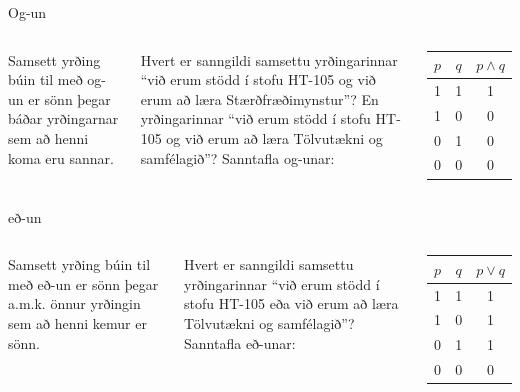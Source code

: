 \documentclass[handout]{beamer}
\begin{document}
\begin{frame}{Og-un}
\begin{columns}
Samsett yrðing búin til með og-un er sönn þegar báðar yrðingarnar sem að henni koma eru sannar.

\vspace*{0.5cm}
Hvert er sanngildi samsettu yrðingarinnar ``við erum stödd í stofu HT-105 og við erum að læra Stærðfræðimynstur''? En yrðingarinnar ``við erum stödd í stofu HT-105 og við erum að læra Tölvutækni og samfélagið''?
Sanntafla og-unar:
\begin{center}
\begin{tabular}{ccc}
\toprule
$p$&$q$&$p \land q$ \\
\midrule
1&1&1\\
1&0&0\\
0&1&0\\
0&0&0\\
\bottomrule
\end{tabular}
\end{center}
\end{columns}
\end{frame}

\begin{frame}{eð-un}
\begin{columns}
Samsett yrðing búin til með eð-un er sönn þegar a.m.k. önnur yrðingin sem að henni kemur er sönn.

\vspace*{0.5cm}
Hvert er sanngildi samsettu yrðingarinnar ``við erum stödd í stofu HT-105 eða við erum að læra Tölvutækni og samfélagið''?
Sanntafla eð-unar:
\begin{center}
\begin{tabular}{ccc}
\toprule
$p$&$q$&$p \lor q$ \\
\midrule
1&1&1\\
1&0&1\\
0&1&1\\
0&0&0\\
\bottomrule
\end{tabular}
\end{center}
\end{columns}
\end{frame}
\end{document}
